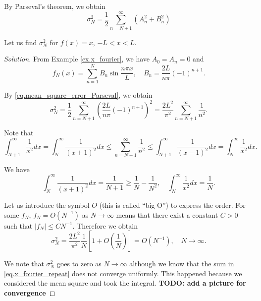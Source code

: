 By Parseval's theorem, we obtain
\begin{equation}\label{eq.mean_square_error_Parseval}
    \sigma_N^2=\frac{1}{2} \sum_{n=N+1}^{\infty}\left(A_n^2+B_n^2\right)
\end{equation}

\begin{example}[]
Let us find $\sigma_N^2$ for $f(x)=x$, $-L<x<L$. 
\end{example}
\begin{proof}[Solution]
From Example \ref{ex.x_fourier}, we have $A_0=A_n=0$ and
\begin{equation}\label{eq.x_fourier_repeat}
    f_N(x)=\sum_{n=1}^N B_n \sin \frac{n \pi x}{L}, \quad B_n=\frac{2 L}{n \pi}(-1)^{n+1} .
\end{equation}

By \eqref{eq.mean_square_error_Parseval}, we obtain
$$
\sigma_N^2=\frac{1}{2} \sum_{n=N+1}^{\infty}\left(\frac{2 L}{n \pi}(-1)^{n+1}\right)^2=\frac{2 L^2}{\pi^2} \sum_{n=N+1}^{\infty} \frac{1}{n^2} .
$$

Note that
$$
\int_{N+1}^{\infty} \frac{1}{x^2} d x=\int_N^{\infty} \frac{1}{(x+1)^2} d x \leq \sum_{n=N+1}^{\infty} \frac{1}{n^2} \leq \int_{N+1}^{\infty} \frac{1}{(x-1)^2} d x=\int_N^{\infty} \frac{1}{x^2} d x .
$$

We have
$$
\int_N^{\infty} \frac{1}{(x+1)^2} d x=\frac{1}{N+1} \ge \frac{1}{N} - \frac{1}{N^2}, \quad \int_N^{\infty} \frac{1}{x^2} d x=\frac{1}{N} .
$$

Let us introduce the symbol $O$ (this is called ``big O'') to express the order. For some $f_N$, $f_N=O\left(N^{-1}\right)$ as $N \rightarrow \infty$ means that there exist a constant $C>0$ such that $\left|f_N\right| \leq C N^{-1}$. Therefore we obtain
\begin{equation}\label{eq.x_fourier_mse_converge}
    \sigma_N^2=\frac{2 L^2}{\pi^2} \frac{1}{N}\left[1+O\left(\frac{1}{N}\right)\right]=O\left(N^{-1}\right), \quad N \rightarrow \infty .
\end{equation}

We note that $\sigma_N^2$ goes to zero as $N \rightarrow \infty$ although we know that the sum in \eqref{eq.x_fourier_repeat} does not converge uniformly. This happened because we considered the mean square and took the integral. \textbf{TODO: add a picture for convergence}
\end{proof}

